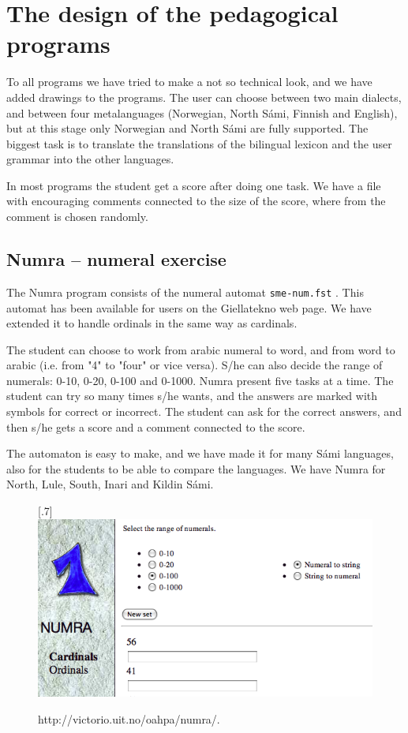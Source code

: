\documentclass[a4paper,12pt]{article}
\begin{document}
\section{The design of the pedagogical programs}
To all programs we have tried to make a not so technical look, and we have added drawings to the programs. The user can choose between two main dialects, and between four metalanguages (Norwegian, North Sámi, Finnish and English), but at this stage only Norwegian and North Sámi are fully supported. The biggest task is to translate the translations of the bilingual lexicon and the user grammar into the other languages.  

In most programs the student get a score after doing one task. We have a file with encouraging comments connected to the size of the score, where from the comment is chosen randomly.

\subsection{Numra -- numeral exercise}
The Numra program consists of the numeral automat \texttt{sme-num.fst} . This automat has been available for users on the Giellatekno web page. We have extended it to handle ordinals in the same way as cardinals.  

The student can choose to work from arabic numeral to word, and from word to arabic (i.e. from "4" to "four" or vice versa). S/he can also decide the range of numerals: 0-10, 0-20, 0-100 and 0-1000. Numra present five tasks at a time. The student can try so many times s/he wants, and the answers are marked with symbols for correct or incorrect. The student can ask for the correct answers, and then s/he gets a score and a comment connected to the score.

The automaton is easy to make, and we have made it for many Sámi languages, also for the students to be able to compare the languages. We have Numra for North, Lule, South, Inari and Kildin Sámi.\\ 


\begin{figure}[htbp]
\begin{center}
\scalebox{.7}[.7]{\includegraphics{img/numra.png}}\\
\caption{http://victorio.uit.no/oahpa/numra/.}
\label{numra}
\end{center}
\end{figure}
\end{document}
